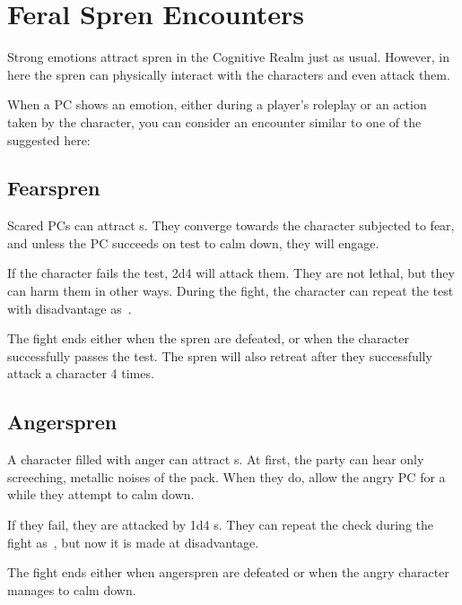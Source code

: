 \section{Feral Spren Encounters}
\label{ssec:shadesmarFeralEncounters}

Strong emotions attract spren in the Cognitive Realm just as usual. However, in here the spren can physically interact with the characters and even attack them.

When a PC shows an emotion, either during a player's roleplay or an action taken by the character, you can consider an encounter similar to one of the suggested here: 



\subsection{Fearspren}

Scared PCs can attract \enemyFearSpren{}s. They converge towards the character subjected to fear, and unless the PC succeeds on  test to calm down, they will engage.

If the character fails the test, 2d4 \enemyFearSpren{} will attack them. They are not lethal, but they can harm them in other ways. During the fight, the character can repeat the test with disadvantage as~\iconAction{}.

The fight ends either when the spren are defeated, or when the character successfully passes the test. The spren will also retreat after they successfully attack a character 4 times.




\subsection{Angerspren}

A character filled with anger can attract \enemyAngerSpren{}s. At first, the party can hear only screeching, metallic
noises of the pack. When they do, allow the angry PC for a  while they attempt to calm down.

If they fail, they are attacked by 1d4 \enemyAngerSpren{}s. They can repeat the check during the fight as~\iconAction{}, but now it is made at disadvantage.

The fight ends either when angerspren are defeated or when the angry character manages to calm down.


